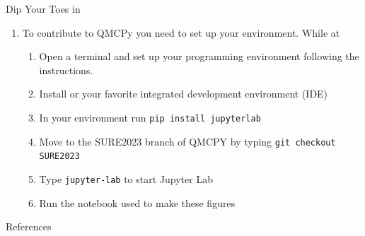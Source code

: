 \documentclass[10pt,compress,xcolor={usenames,dvipsnames},aspectratio=169]{beamer}
\begin{document}
\begin{frame}{Dip Your Toes in}
\begin{enumerate}
    \item To contribute to QMCPy you need to set up your environment.  While at \href{https://github.com/QMCSoftware/QMCSoftware/blob/master/CONTRIBUTING.md}{} 
    \begin{enumerate}[a]
    \item Open a terminal and set up your programming environment following the instructions.
    \item Install \href{https://code.visualstudio.com}{} or your favorite integrated development environment (IDE)
    \item In your environment run  \texttt{\alert{pip install jupyterlab}}
    \item Move to the \alert{SURE2023} branch of QMCPY by typing \texttt{\alert{git checkout SURE2023}}
    \item Type \texttt{\alert{jupyter-lab}} to start Jupyter Lab
    \item Run the notebook used to make these figures
    \end{enumerate}
\end{enumerate}
    
\end{frame}


\begin{frame}[allowframebreaks]{References}
	\printbibliography
\end{frame}
\end{document}
